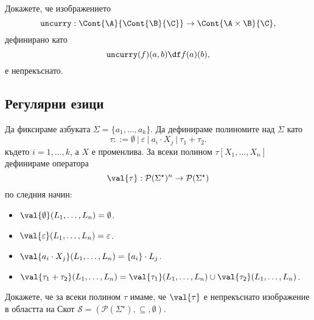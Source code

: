 \begin{problem}
  Докажете, че изображението
  \[\texttt{uncurry}:\Cont{\A}{\Cont{\B}{\C}} \to \Cont{\A\times \B}{\C},\]
  дефинирано като
  \[\texttt{uncurry}(f)(a,b) \df f(a)(b),\]
  е непрекъснато.
\end{problem}




\newpage
\subsection{Регулярни езици}

Да фиксираме азбуката $\Sigma = \{a_1,\dots,a_k\}$.
Да дефинираме полиномите над $\Sigma$ като
\[\tau ::= \emptyset\ |\ \varepsilon\ |\ a_i \cdot X_j\ |\ \tau_1 + \tau_2.\]
където $i = 1, \dots,k$, а $X$ е променлива.
За всеки полином $\tau[X_1,\dots,X_n]$ дефинираме оператора 
\[\val{\tau}: \mathcal{P}(\Sigma^\star)^n \to \mathcal{P}(\Sigma^\star)\]
 по следния начин:
\begin{itemize}
\item
    $\val{\emptyset}(L_1,\dots,L_n) = \emptyset$.
\item 
  $\val{\varepsilon}(L_1,\dots,L_n) = \varepsilon$.
\item 
  $\val{a_i \cdot X_j}(L_1,\dots,L_n) = \{a_i\} \cdot L_j$.
\item
  $\val{\tau_1 + \tau_2}(L_1,\dots,L_n) = \val{\tau_1}(L_1,\dots,L_n) \cup \val{\tau_2}(L_1,\dots,L_n)$.
\end{itemize}

\begin{problem}
  Докажете, че за всеки полином $\tau$ имаме, че $\val{\tau}$ е непрекъснато изображение в областта на Скот
  $\mathcal{S} = ( \mathcal{P}(\Sigma^\star),\subseteq, \emptyset)$.
\end{problem}


